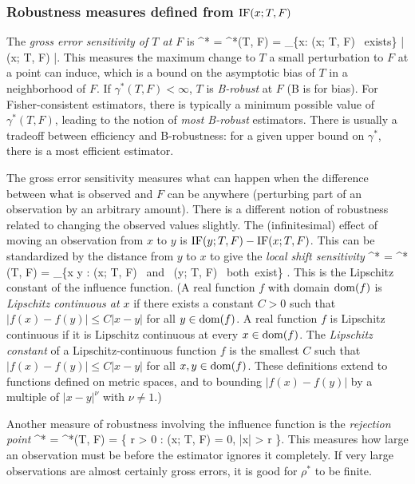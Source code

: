 \subsubsection{Robustness measures defined from ${\rm IF}(x; T, F)$}
The {\em gross error sensitivity of $T$ at $F$} is
\beq
    \gamma^* = \gamma^*(T, F) = \sup_{\{x: \IF(x; T, F) \mbox{ exists}\}} | \IF(x; T, F) |.
\eeq
This measures the  maximum change to $T$ a small perturbation to $F$ at a point can
induce, which is a bound on the asymptotic  bias of $T$ in a neighborhood of $F$.
If $\gamma^*(T,F) < \infty$, $T$ is {\em B-robust} at $F$ (B is for bias).
For Fisher-consistent estimators, there is typically a minimum possible value of
$\gamma^*(T, F)$, leading to the notion of {\em most B-robust} estimators.
There is usually a tradeoff between efficiency and B-robustness: for a given upper
bound on $\gamma^*$, there is a most efficient estimator.

The gross error sensitivity measures what can happen when the difference between what is
observed and $F$ can be anywhere (perturbing part of an observation by an
arbitrary amount).
There is a different notion of robustness related to
changing the observed values slightly.
The (infinitesimal) effect of moving an observation from $x$ to $y$   is
${\rm IF}(y; T, F) - {\rm IF}(x; T, F)$.
This can be standardized by the distance from $y$ to $x$
to give the {\em local shift sensitivity}
\beq
    \lambda^* = \lambda^*(T, F) =
    \sup_{\{x \ne y : \IF(x; T, F) \mbox{ and } \IF(y; T, F) \mbox{ both exist}\}}
     .
\eeq
This is the Lipschitz constant of the influence function.
(A real function $f$ with domain ${\rm dom}(f)$
is {\em Lipschitz continuous at $x$} if there exists a constant
$C > 0$ such that $|f(x) - f(y)| \le C | x-y|$ for all $y \in {\rm dom}(f)$.
A real function $f$ is Lipschitz continuous if it is Lipschitz continuous at every
$x \in {\rm dom}(f)$.
The {\em Lipschitz constant\/} of a Lipschitz-continuous function $f$ is
the smallest $C$ such that $|f(x) - f(y)| \le C | x-y|$ for all $x, y \in {\rm dom}(f)$.
These definitions extend to functions defined on metric spaces, and to bounding 
$|f(x) - f(y)|$ by a multiple of $| x - y |^\nu$ with $\nu \ne 1$.)

Another measure of robustness involving the influence function is the
{\em rejection point}
\beq
    \rho^* = \rho^*(T, F) = \inf \{ r > 0 : \IF(x; T, F) = 0, \;\;\forall |x| > r \}.
\eeq
This measures how large an observation must be before the estimator ignores it
completely.
If very large observations are almost certainly
gross errors, it is good for $\rho^*$ to be finite.

